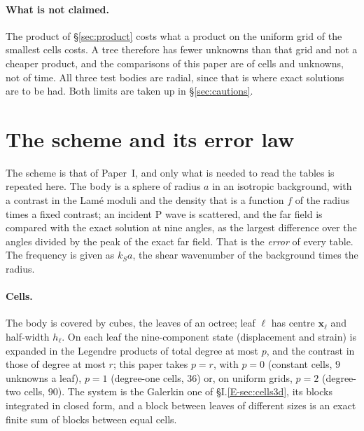 \documentclass[11pt,a4paper]{article}
\newcommand{\bx}{\mathbf{x}}
\begin{document}
\paragraph{What is not claimed.} The product of \S\ref{sec:product} costs what a product on the uniform
grid of the smallest cells costs. A tree therefore has fewer unknowns than that grid and not a cheaper
product, and the comparisons of this paper are of cells and unknowns, not of time. All three test bodies
are radial, since that is where exact solutions are to be had. Both limits are taken up in
\S\ref{sec:cautions}.

\section{The scheme and its error law}\label{sec:setting}

The scheme is that of Paper~I, and only what is needed to read the tables is repeated here. The body is
a sphere of radius $a$ in an isotropic background, with a contrast in the Lam\'e moduli and the density
that is a function $f$ of the radius times a fixed contrast; an incident P wave is scattered, and the
far field is compared with the exact solution at nine angles, as the largest difference over the angles
divided by the peak of the exact far field. That is the \emph{error} of every table. The frequency is
given as $k_Sa$, the shear wavenumber of the background times the radius.

\paragraph{Cells.} The body is covered by cubes, the leaves of an octree; leaf $\ell$ has centre
$\bx_\ell$ and half-width $h_\ell$. On each leaf the nine-component state (displacement and strain) is
expanded in the Legendre products of total degree at most $p$, and the contrast in those of degree at
most $r$; this paper takes $p=r$, with $p=0$ (constant cells, $9$ unknowns a leaf), $p=1$ (degree-one
cells, $36$) or, on uniform grids, $p=2$ (degree-two cells, $90$). The system is the Galerkin one of \S I.\ref{E-sec:cells3d}, its blocks integrated in closed
form, and a block between leaves of different sizes is an exact finite sum of blocks between equal cells.
\end{document}
